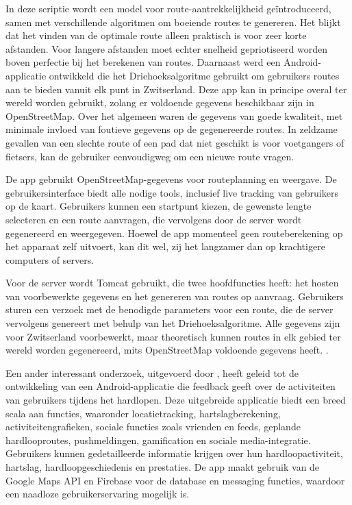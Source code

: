      \hspace{2cm}

    \textcite{Schulze2016} In deze scriptie wordt een model voor route-aantrekkelijkheid geïntroduceerd, 
    samen met verschillende algoritmen om boeiende routes te genereren. 
    Het blijkt dat het vinden van de optimale route alleen praktisch is voor zeer korte afstanden. 
    Voor langere afstanden moet echter snelheid gepriotiseerd worden boven perfectie bij het berekenen van routes. 
    Daarnaast werd een Android-applicatie ontwikkeld die het Driehoeksalgoritme gebruikt om gebruikers routes aan te bieden
    vanuit elk punt in Zwitserland. Deze app kan in principe overal ter wereld worden gebruikt, 
    zolang er voldoende gegevens beschikbaar zijn in OpenStreetMap. Over het algemeen waren de gegevens van goede kwaliteit, 
    met minimale invloed van foutieve gegevens op de gegenereerde routes. 
    In zeldzame gevallen van een slechte route of een pad dat niet geschikt is voor voetgangers of fietsers, 
    kan de gebruiker eenvoudigweg om een nieuwe route vragen.

 
    De app gebruikt OpenStreetMap-gegevens voor routeplanning en weergave. 
    De gebruikersinterface biedt alle nodige tools, inclusief live tracking van gebruikers op de kaart. 
    Gebruikers kunnen een startpunt kiezen, de gewenste lengte selecteren en een route aanvragen, 
    die vervolgens door de server wordt gegenereerd en weergegeven. Hoewel de app momenteel geen routeberekening op het apparaat zelf uitvoert, 
    kan dit wel, zij het langzamer dan op krachtigere computers of servers.

    
    Voor de server wordt Tomcat gebruikt, die twee hoofdfuncties heeft: 
    het hosten van voorbewerkte gegevens en het genereren van routes op aanvraag. 
    Gebruikers sturen een verzoek met de benodigde parameters voor een route, 
    die de server vervolgens genereert met behulp van het Driehoeksalgoritme. 
    Alle gegevens zijn voor Zwitserland voorbewerkt, maar theoretisch kunnen routes in elk gebied ter wereld worden gegenereerd, 
    mits OpenStreetMap voldoende gegevens heeft.
    \autocite{Schulze2016}.

    \hspace{2cm}

    Een ander interessant onderzoek, uitgevoerd door \textcite{Adwinda2020}, 
    heeft geleid tot de ontwikkeling van een Android-applicatie die feedback geeft over de activiteiten van gebruikers tijdens het hardlopen. 
    Deze uitgebreide applicatie biedt een breed scala aan functies, waaronder locatietracking, hartslagberekening, activiteitengrafieken, sociale functies zoals vrienden en feeds, 
    geplande hardlooproutes, pushmeldingen, gamification en sociale media-integratie. Gebruikers kunnen gedetailleerde informatie krijgen over hun hardloopactiviteit, hartslag, 
    hardloopgeschiedenis en prestaties. De app maakt gebruik van de Google Maps API en Firebase voor de database en messaging functies, waardoor een naadloze gebruikerservaring mogelijk is.

